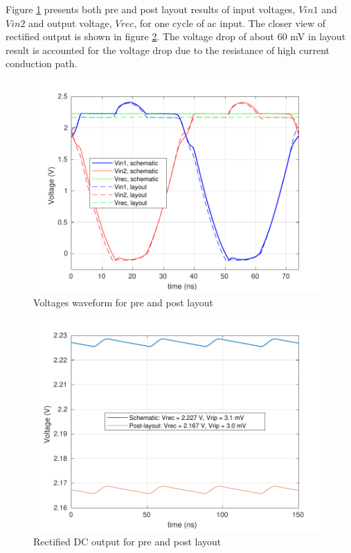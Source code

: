 \documentclass[UKenglish]{ifimaster}  %
\begin{document}
Figure  \ref{fig:rect_v_post}  presents both pre and post layout results of input voltages, $Vin1$ and $Vin2$  and output voltage, $Vrec$, for one cycle of ac input. The closer view of rectified output is shown in figure \ref{fig:rect_ripple}. The voltage drop of about 60 mV in layout result is accounted for the voltage drop due to 
the resistance of high current conduction path. \\

\begin{figure}[!htbp] %
   \centering
   \includegraphics[width=\textwidth]{img/rectifier_V_post.pdf} 
   \caption{Voltages waveform for pre and post layout}
   \label{fig:rect_v_post}
\end{figure}

\begin{figure}[!htbp] %
   \centering
   \includegraphics[width=\textwidth]{img/rectifier_ripple.pdf} 
   \caption{Rectified DC output for pre and post layout}
   \label{fig:rect_ripple}
\end{figure}
\end{document}
